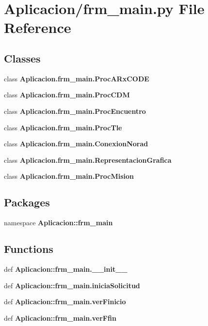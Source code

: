 \section{\-Aplicacion/frm\-\_\-main.py \-File \-Reference}
\label{frm__main_8py}
\subsection*{\-Classes}
\begin{DoxyCompactItemize}
\item 
class {\bf \-Aplicacion.\-frm\-\_\-main.\-Proc\-A\-Rx\-C\-O\-D\-E}
\item 
class {\bf \-Aplicacion.\-frm\-\_\-main.\-Proc\-C\-D\-M}
\item 
class {\bf \-Aplicacion.\-frm\-\_\-main.\-Proc\-Encuentro}
\item 
class {\bf \-Aplicacion.\-frm\-\_\-main.\-Proc\-Tle}
\item 
class {\bf \-Aplicacion.\-frm\-\_\-main.\-Conexion\-Norad}
\item 
class {\bf \-Aplicacion.\-frm\-\_\-main.\-Representacion\-Grafica}
\item 
class {\bf \-Aplicacion.\-frm\-\_\-main.\-Proc\-Mision}
\end{DoxyCompactItemize}
\subsection*{\-Packages}
\begin{DoxyCompactItemize}
\item 
namespace {\bf \-Aplicacion\-::frm\-\_\-main}
\end{DoxyCompactItemize}
\subsection*{\-Functions}
\begin{DoxyCompactItemize}
\item 
def {\bf \-Aplicacion\-::frm\-\_\-main.\-\_\-\-\_\-init\-\_\-\-\_\-}
\item 
def {\bf \-Aplicacion\-::frm\-\_\-main.\-inicia\-Solicitud}
\item 
def {\bf \-Aplicacion\-::frm\-\_\-main.\-ver\-Finicio}
\item 
def {\bf \-Aplicacion\-::frm\-\_\-main.\-ver\-Ffin}
\end{DoxyCompactItemize}
